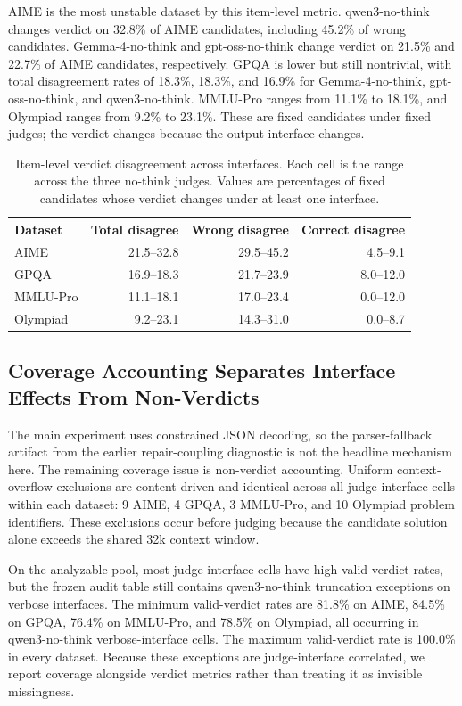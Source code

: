 \documentclass[journal]{IEEEtran}
\begin{document}
AIME is the most unstable dataset by this item-level metric. qwen3-no-think changes verdict on 32.8\% of AIME candidates, including 45.2\% of wrong candidates. Gemma-4-no-think and gpt-oss-no-think change verdict on 21.5\% and 22.7\% of AIME candidates, respectively. GPQA is lower but still nontrivial, with total disagreement rates of 18.3\%, 18.3\%, and 16.9\% for Gemma-4-no-think, gpt-oss-no-think, and qwen3-no-think. MMLU-Pro ranges from 11.1\% to 18.1\%, and Olympiad ranges from 9.2\% to 23.1\%. These are fixed candidates under fixed judges; the verdict changes because the output interface changes.

\begin{table}[t]
\centering
\footnotesize
\setlength{\tabcolsep}{4pt}
\begin{tabular}{lrrr}
\toprule
Dataset & Total disagree & Wrong disagree & Correct disagree \\
\midrule
AIME & 21.5--32.8 & 29.5--45.2 & 4.5--9.1 \\
GPQA & 16.9--18.3 & 21.7--23.9 & 8.0--12.0 \\
MMLU-Pro & 11.1--18.1 & 17.0--23.4 & 0.0--12.0 \\
Olympiad & 9.2--23.1 & 14.3--31.0 & 0.0--8.7 \\
\bottomrule
\end{tabular}
\caption{Item-level verdict disagreement across interfaces. Each cell is the range across the three no-think judges. Values are percentages of fixed candidates whose verdict changes under at least one interface.}
\label{tab:item-disagreement}
\end{table}

\subsection{Coverage Accounting Separates Interface Effects From Non-Verdicts}
\label{sec:results-coverage}

The main experiment uses constrained JSON decoding, so the parser-fallback artifact from the earlier repair-coupling diagnostic is not the headline mechanism here. The remaining coverage issue is non-verdict accounting. Uniform context-overflow exclusions are content-driven and identical across all judge-interface cells within each dataset: 9 AIME, 4 GPQA, 3 MMLU-Pro, and 10 Olympiad problem identifiers. These exclusions occur before judging because the candidate solution alone exceeds the shared 32k context window.

On the analyzable pool, most judge-interface cells have high valid-verdict rates, but the frozen audit table still contains qwen3-no-think truncation exceptions on verbose interfaces. The minimum valid-verdict rates are 81.8\% on AIME, 84.5\% on GPQA, 76.4\% on MMLU-Pro, and 78.5\% on Olympiad, all occurring in qwen3-no-think verbose-interface cells. The maximum valid-verdict rate is 100.0\% in every dataset. Because these exceptions are judge-interface correlated, we report coverage alongside verdict metrics rather than treating it as invisible missingness.
\end{document}
